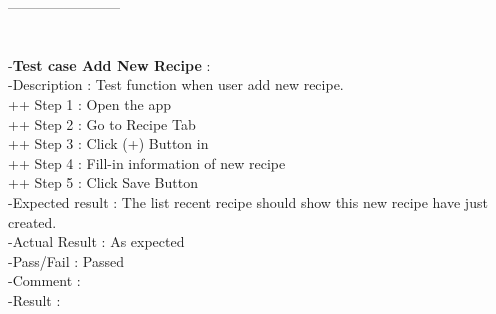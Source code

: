 \documentclass{article}
\begin{document}
         ------------------------\\ \\ \\
        -\textbf{Test case Add New Recipe }: \\
        -Description : Test function when user add new recipe. \\
        ++ Step 1 : Open the app  \\
        ++ Step 2 : Go to Recipe Tab \\
        ++ Step 3 : Click (+) Button in  \\
        ++ Step 4 : Fill-in information of new recipe \\
        ++ Step 5 : Click Save Button \\
        -Expected result : The list recent recipe should show this new recipe have just created. \\
        -Actual Result : As expected \\
        -Pass/Fail : Passed \\
        -Comment :  \\
        -Result : 
\end{document}
